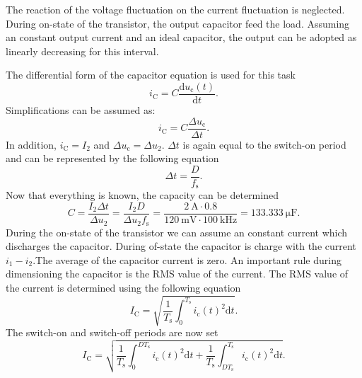 \begin{solutionblock}
    The reaction of the voltage fluctuation on the current fluctuation is neglected. During on-state of the transistor, the output capacitor feed the load. Assuming an constant output current and an ideal capacitor, the output can be adopted as linearly decreasing for this interval.

    The differential form of the capacitor equation is used for this task
    \begin{equation}
        i_\mathrm{C}=C \frac{\mathrm{d}u_\mathrm{c}(t)}{\mathrm{d}t}.
    \end{equation}
    Simplifications can be assumed as:
    \begin{equation}
        i_\mathrm{C}=C \frac{\Delta u_\mathrm{c}}{\Delta t}.
    \end{equation}
    In addition, $i_\mathrm{C}=I_\mathrm{2}$ and $\Delta u_\mathrm{c}=\Delta u_\mathrm{2}$.
    $\Delta t$ is again equal to the switch-on period and can be represented by the following equation
    \begin{equation}
        \Delta t = \frac{D}{f_\mathrm{s}}. 
    \end{equation}
    Now that everything is known, the capacity can be determined
    \begin{equation}
        C = \frac{I_\mathrm{2}\Delta t}{\Delta u_\mathrm{2}}= \frac{I_\mathrm{2}D}{\Delta u_\mathrm{2}f_\mathrm{s}}=\frac{\SI{2}{\ampere}\cdot 0.8}{\SI{120}{\milli\volt} \cdot \SI{100}{\kilo\hertz}}=\SI{133.333}{\micro\farad}.
    \end{equation}
     During the on-state of the transistor we can assume an constant current which discharges the capacitor. During of-state the capacitor is charge with the current $i_\mathrm{1}-i_\mathrm{2}$.The average of the capacitor current is zero. An important rule during dimensioning the capacitor is the RMS value of the current.
     The RMS value of the current is determined using the following equation
     \begin{equation}
        I_\mathrm{C}=\sqrt{\frac{1}{T_\mathrm{s}}\int_{0}^{T_\mathrm{s}}i_\mathrm{c}(t)^2\mathrm{d}t}.
     \end{equation}
     The switch-on and switch-off periods are now set
     \begin{equation}
        I_\mathrm{C}=\sqrt{\frac{1}{T_\mathrm{s}}\int_{0}^{DT_\mathrm{s}}i_\mathrm{c}(t)^2\mathrm{d}t+\frac{1}{T_\mathrm{s}}\int_{DT_\mathrm{s}}^{T_\mathrm{s}}i_\mathrm{c}(t)^2\mathrm{d}t}.

\end{equation}
\end{solutionblock}

